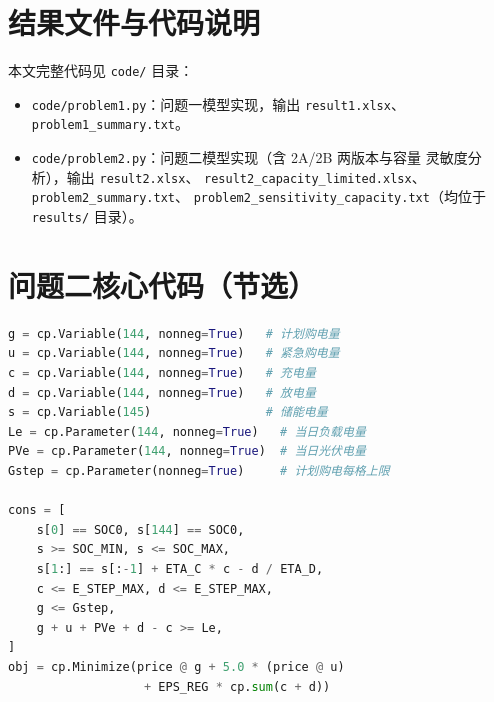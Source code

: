 \documentclass[withoutpreface,bwprint]{cumcmthesis}
\begin{document}
\begin{appendices}
\section{结果文件与代码说明}
本文完整代码见 \texttt{code/} 目录：
\begin{itemize}[leftmargin=2em]
\raggedright
\item[] \texttt{code/problem1.py}：问题一模型实现，输出
\texttt{result1.xlsx}、\texttt{problem1\_summary.txt}。
\item[] \texttt{code/problem2.py}：问题二模型实现（含 2A/2B 两版本与容量
灵敏度分析），输出 \texttt{result2.xlsx}、
\texttt{result2\_capacity\_limited.xlsx}、
\texttt{problem2\_summary.txt}、
\texttt{problem2\_sensitivity\_capacity.txt}（均位于 \texttt{results/} 目录）。
\end{itemize}

\section{问题二核心代码（节选）}
\begin{lstlisting}[language=Python]
g = cp.Variable(144, nonneg=True)   # 计划购电量
u = cp.Variable(144, nonneg=True)   # 紧急购电量
c = cp.Variable(144, nonneg=True)   # 充电量
d = cp.Variable(144, nonneg=True)   # 放电量
s = cp.Variable(145)                # 储能电量
Le = cp.Parameter(144, nonneg=True)   # 当日负载电量
PVe = cp.Parameter(144, nonneg=True)  # 当日光伏电量
Gstep = cp.Parameter(nonneg=True)     # 计划购电每格上限

cons = [
    s[0] == SOC0, s[144] == SOC0,
    s >= SOC_MIN, s <= SOC_MAX,
    s[1:] == s[:-1] + ETA_C * c - d / ETA_D,
    c <= E_STEP_MAX, d <= E_STEP_MAX,
    g <= Gstep,
    g + u + PVe + d - c >= Le,
]
obj = cp.Minimize(price @ g + 5.0 * (price @ u)
                   + EPS_REG * cp.sum(c + d))
\end{lstlisting}
\end{appendices}
\end{document}
